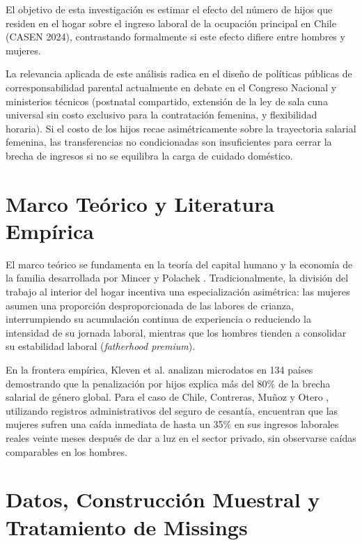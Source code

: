 \documentclass[11pt,a4paper]{article}
\begin{document}
El objetivo de esta investigación es estimar el efecto del número de hijos que residen en el hogar sobre el ingreso laboral de la ocupación principal en Chile (CASEN 2024), contrastando formalmente si este efecto difiere entre hombres y mujeres. 

La relevancia aplicada de este análisis radica en el diseño de políticas públicas de corresponsabilidad parental actualmente en debate en el Congreso Nacional y ministerios técnicos (postnatal compartido, extensión de la ley de sala cuna universal sin costo exclusivo para la contratación femenina, y flexibilidad horaria). Si el costo de los hijos recae asimétricamente sobre la trayectoria salarial femenina, las transferencias no condicionadas son insuficientes para cerrar la brecha de ingresos si no se equilibra la carga de cuidado doméstico.

\section{Marco Teórico y Literatura Empírica}
El marco teórico se fundamenta en la teoría del capital humano y la economía de la familia desarrollada por Mincer y Polachek \cite{mincer1974}. Tradicionalmente, la división del trabajo al interior del hogar incentiva una especialización asimétrica: las mujeres asumen una proporción desproporcionada de las labores de crianza, interrumpiendo su acumulación continua de experiencia o reduciendo la intensidad de su jornada laboral, mientras que los hombres tienden a consolidar su estabilidad laboral (\textit{fatherhood premium}).

En la frontera empírica, Kleven et al. \cite{kleven2025} analizan microdatos en 134 países demostrando que la penalización por hijos explica más del 80\% de la brecha salarial de género global. Para el caso de Chile, Contreras, Muñoz y Otero \cite{contreras2023}, utilizando registros administrativos del seguro de cesantía, encuentran que las mujeres sufren una caída inmediata de hasta un 35\% en sus ingresos laborales reales veinte meses después de dar a luz en el sector privado, sin observarse caídas comparables en los hombres.

\section{Datos, Construcción Muestral y Tratamiento de Missings}
\end{document}
